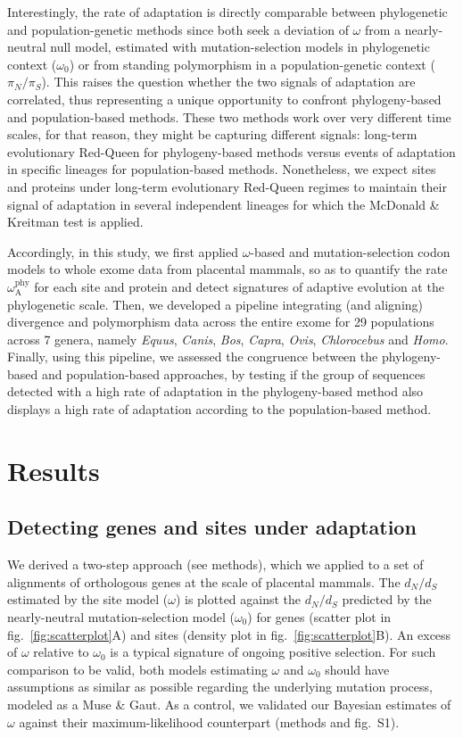 \documentclass{article}
\newcommand{\dn}{d_N}
\newcommand{\ds}{d_S}
\newcommand{\dnds}{\dn / \ds}
\newcommand{\rateApop}{\omega_{\mathrm{A}}}
\newcommand{\rateAphy}{\rateApop^{\mathrm{phy}}}
\newcommand{\pn}{\pi_N}
\newcommand{\ps}{\pi_S}
\newcommand{\pnps}{\pn / \ps}
\begin{document}
    Interestingly, the rate of adaptation is directly comparable between phylogenetic and population-genetic methods since both seek a deviation of $\omega$  from a nearly-neutral null model, estimated with mutation-selection models in phylogenetic context ($\omega_{0}$) or from standing polymorphism in a population-genetic context ($\pnps$).
    This raises the question whether the two signals of adaptation are correlated, thus representing a unique opportunity to confront phylogeny-based and population-based methods.
    These two methods work over very different time scales, for that reason, they might be capturing different signals: long-term evolutionary Red-Queen for phylogeny-based methods versus events of adaptation in specific lineages for population-based methods.
    Nonetheless, we expect sites and proteins under long-term evolutionary Red-Queen regimes to maintain their signal of adaptation in several independent lineages for which the McDonald \& Kreitman test is applied.

    Accordingly, in this study, we first applied $\omega$-based and mutation-selection codon models to whole exome data from placental mammals, so as to quantify the rate $\rateAphy$ for each site and protein and detect signatures of adaptive evolution at the phylogenetic scale.
    Then, we developed a pipeline integrating (and aligning) divergence and polymorphism data across the entire exome for 29 populations across 7 genera, namely \textit{Equus}, \textit{Canis}, \textit{Bos}, \textit{Capra}, \textit{Ovis}, \textit{Chlorocebus} and \textit{Homo}.
    Finally, using this pipeline, we assessed the congruence between the phylogeny-based and population-based approaches, by testing if the group of sequences detected with a high rate of adaptation in the phylogeny-based method also displays a high rate of adaptation according to the population-based method.

    \section*{Results}\label{sec:results}
    \subsection*{Detecting genes and sites under adaptation}
    We derived a two-step approach (see methods), which we applied to a set of alignments of orthologous genes at the scale of placental mammals.
    The $\dnds$ estimated by the site model ($\omega$) is plotted against the $\dnds$ predicted by the nearly-neutral mutation-selection model ($\omega_{0}$) for genes (scatter plot in fig.~\ref{fig:scatterplot}A) and sites (density plot in fig.~\ref{fig:scatterplot}B).
    An excess of $\omega$ relative to $\omega_{0}$ is a typical signature of ongoing positive selection\cite{bloom_identification_2017, rodrigue_detecting_2017}.
    For such comparison to be valid, both models estimating $\omega$ and $\omega_{0}$ should have assumptions as similar as possible regarding the underlying mutation process, modeled as a Muse \& Gaut\cite{muse_likelihood_1994, spielman_relationship_2015}.
    As a control, we validated our Bayesian estimates of $\omega$ against their maximum-likelihood counterpart (methods and fig.~S1).
\end{document}

